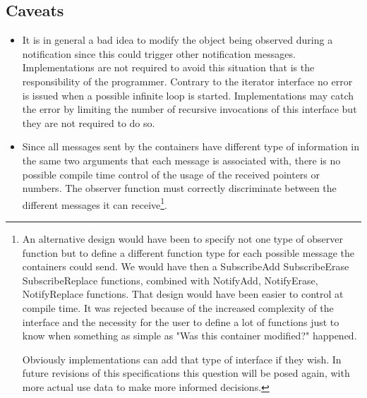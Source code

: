 \documentclass[12pt,a4paper]{memoir} %
\begin{document}
\subsection{Caveats}
\begin{itemize}
\item
It is in general a bad idea to modify the object being observed during a notification since this could trigger other notification
messages. Implementations are not required to avoid this situation that is the responsibility of the programmer. Contrary to the iterator interface
no error is issued when a possible infinite loop is started. Implementations may catch the error by limiting the number of recursive
invocations of this interface but they are not required to do so.
\item
Since all messages sent by the containers have different type of information in the same two arguments that each message is associated with,
there is no possible compile time control of the usage of the received pointers or numbers. The observer function must correctly 
discriminate between the different messages it can receive\footnote{An alternative design would have been to specify not one type of
observer function but to define a different function type for each possible message the containers could send. We would have then a SubscribeAdd
SubscribeErase SubscribeReplace functions, combined with NotifyAdd, NotifyErase, NotifyReplace functions. That design would have been easier to
control at compile time. It was rejected because of the increased complexity of the interface and the necessity for the user to define a lot
of functions just to know when something as simple as "Was this container modified?" happened.

Obviously implementations can add that type of interface if they wish. In future revisions of this specifications this question will be posed again, with more actual use data to make more informed decisions.}.
\end{itemize}
\end{document}
